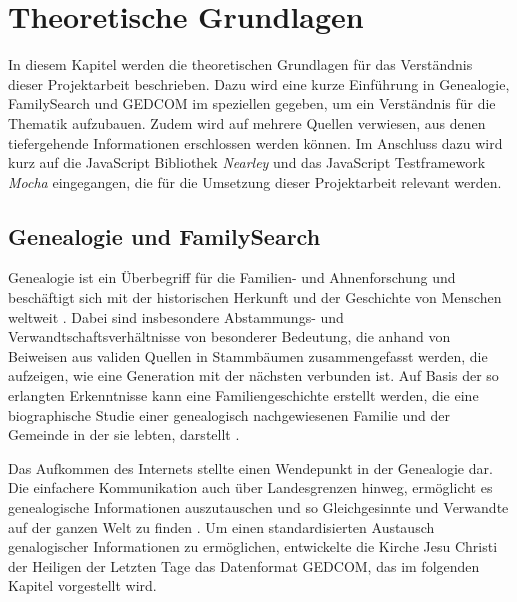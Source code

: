\chapter{Theoretische Grundlagen}
\label{chap: Theoretische Grundlagen}
In diesem Kapitel werden die theoretischen Grundlagen für das Verständnis dieser Projektarbeit beschrieben. Dazu wird eine kurze Einführung in Genealogie, FamilySearch und GEDCOM im speziellen gegeben, um ein Verständnis für die Thematik aufzubauen. Zudem wird auf mehrere Quellen verwiesen, aus denen tiefergehende Informationen erschlossen werden können. Im Anschluss dazu wird kurz auf die JavaScript Bibliothek \textit{Nearley} und das JavaScript Testframework \textit{Mocha} eingegangen, die für die Umsetzung dieser Projektarbeit relevant werden.

\section{Genealogie und FamilySearch}
\label{sec: Genealogie und FamilySearch}
Genealogie ist ein Überbegriff für die Familien- und Ahnenforschung und beschäftigt sich mit der historischen Herkunft und der Geschichte von Menschen weltweit \cite{AhnenforschungDE}. Dabei sind insbesondere Abstammungs- und Verwandtschaftsverhältnisse von besonderer Bedeutung, die anhand von Beiweisen aus validen Quellen in Stammbäumen zusammengefasst werden, die aufzeigen, wie eine Generation mit der nächsten verbunden ist. Auf Basis der so erlangten Erkenntnisse kann eine Familiengeschichte erstellt werden, die eine biographische Studie einer genealogisch nachgewiesenen Familie und der Gemeinde in der sie lebten, darstellt \cite{SocietyOfGenealogists}.

Das Aufkommen des Internets stellte einen Wendepunkt in der Genealogie dar. Die einfachere Kommunikation auch über Landesgrenzen hinweg, ermöglicht es genealogische Informationen auszutauschen und so Gleichgesinnte und Verwandte auf der ganzen Welt zu finden \cite{AhnenforschungDE}. Um einen standardisierten Austausch genalogischer Informationen zu ermöglichen, entwickelte die Kirche Jesu Christi der Heiligen der Letzten Tage das Datenformat GEDCOM, das im folgenden Kapitel vorgestellt wird.
\newpage

